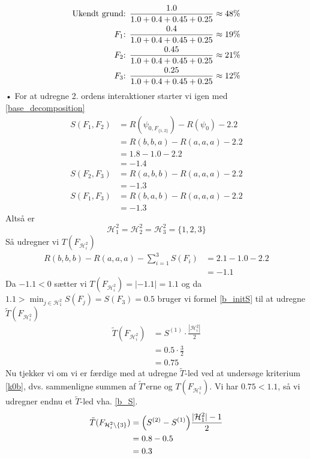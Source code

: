 \documentclass[a4paper, 12pt]{memoir}
\begin{document}
\begin{align*}
\textup{Ukendt grund: }&\frac{1.0}{1.0+0.4+0.45+0.25}\approx 48\%\\
\textup{$F_1$: }&\frac{0.4}{1.0+0.4+0.45+0.25}\approx 19\%\\
\textup{$F_2$: }&\frac{0.45}{1.0+0.4+0.45+0.25}\approx 21\%\\
\textup{$F_3$: }&\frac{0.25}{1.0+0.4+0.45+0.25}\approx 12\%\\
\end{align*}•
For at udregne 2. ordens interaktioner starter vi igen med \eqref{base_decomposition}
\begin{align*}
S(F_1,F_2)&=R(\psi_{0,F_{\{1,2\}}})-R(\psi_0)-2.2\\
&=R(b,b,a)-R(a,a,a)-2.2\\
&=1.8-1.0-2.2\\
&=-1.4\\
S(F_2,F_3)&=R(a,b,b)-R(a,a,a)-2.2\\
&=-1.3\\
S(F_1,F_3)&=R(b,a,b)-R(a,a,a)-2.2\\
&=-1.3
\end{align*}
Altså er 
\begin{equation*}
\mathcal H_1^2=\mathcal H_2^2=\mathcal H_3^2=\{1,2,3\}
\end{equation*}
Så udregner vi $T(F_{\mathcal H_i^2})$
\begin{align*}
R(b,b,b)-R(a,a,a)-\sum_{i=1}^3 S(F_i)&=2.1-1.0-2.2\\
&=-1.1
\end{align*}
Da $-1.1<0$ sætter vi $T(F_{\mathcal H_i^2})=|-1.1|=1.1$ og da $1.1>\min_{j\in \mathcal H_1^2} S(F_j)=S(F_3)=0.5$ bruger vi formel \eqref{b_initS} til at udregne $\tilde T(F_{\mathcal H_i^2})$
\begin{align*}
\tilde T(F_{\mathcal H_i^2})&=S^{(1)}\cdot \frac{|\mathcal H_i^2|}{2}\\
&=0.5\cdot \frac{3}{2}\\
&=0.75
\end{align*}
Nu tjekker vi om vi er færdige med at udregne $\tilde T$-led ved at undersøge kriterium \eqref{k0b}, dvs. sammenligne summen af $\tilde T$'erne og $T(F_{\mathcal H_i^2})$.  Vi har $0.75<1.1$, så vi udregner endnu et $\tilde T$-led vha. \eqref{b_S}. 
\begin{align*}
\tilde T(F_{\mathcal H_i^2\setminus\{3\}})&=\Bigl(S^{(2)}-S^{(1)}\Bigr)\frac{|\mathcal H_1^2|-1}{2}\\
&=0.8-0.5\\
&=0.3
\end{align*}
\end{document}
